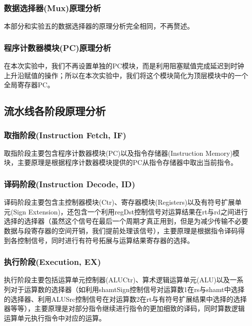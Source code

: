 \documentclass{cumcm}
\numberwithin{equation}{section}
\numberwithin{equation}{subsection}
\begin{document}
\subsubsection{数据选择器(Mux)原理分析}\label{section2.1.7}

本部分和实验五的数据选择器的原理分析完全相同，不再赘述。

\subsubsection{程序计数器模块(PC)原理分析}\label{section2.1.8}

在本次实验中，我们不再设置单独的PC模块，而是利用阻塞赋值完成延迟到时钟上升沿赋值的操作；所以在本次实验中，我们将这个模块简化为顶层模块中的一个全局寄存器PC。

\subsection{流水线各阶段原理分析}\label{section2.2}

\subsubsection{取指阶段(Instruction Fetch, IF)}\label{section2.2.1}

取指阶段主要包含程序计数器模块(PC)以及指令存储器(Instruction Memory)模块，主要原理是根据程序计数器模块提供的PC从指令存储器中取出当前指令。

\subsubsection{译码阶段(Instruction Decode, ID)}\label{section2.2.2}

译码阶段主要包含主控制器模块(Ctr)、寄存器模块(Registers)以及有符号扩展单元(Sign Extension)，还包含一个利用regDst控制信号对运算结果在rt与rd之间进行选择的选择器（虽然这个信号在最后一个周期才真正用到，但是为减少传输不必要数据与段寄存器的空间开销，我们提前处理该信号），主要原理是根据指令译码得到各控制信号，同时进行有符号拓展与运算结果寄存器的选择。

\subsubsection{执行阶段(Execution, EX)} \label{section2.2.3}
执行阶段主要包括运算单元控制器(ALUCtr)、算术逻辑运算单元(ALU)以及一系列对于运算数的选择器（如利用shamtSign控制信号对运算数1在rs与shamt中选择的选择器、利用ALUSrc控制信号在对运算数2在rt与有符号扩展结果中选择的选择器等等），主要原理是对部分指令继续进行指令的更加细致的译码，同时算数逻辑运算单元执行指令中对应的运算。
\end{document}
